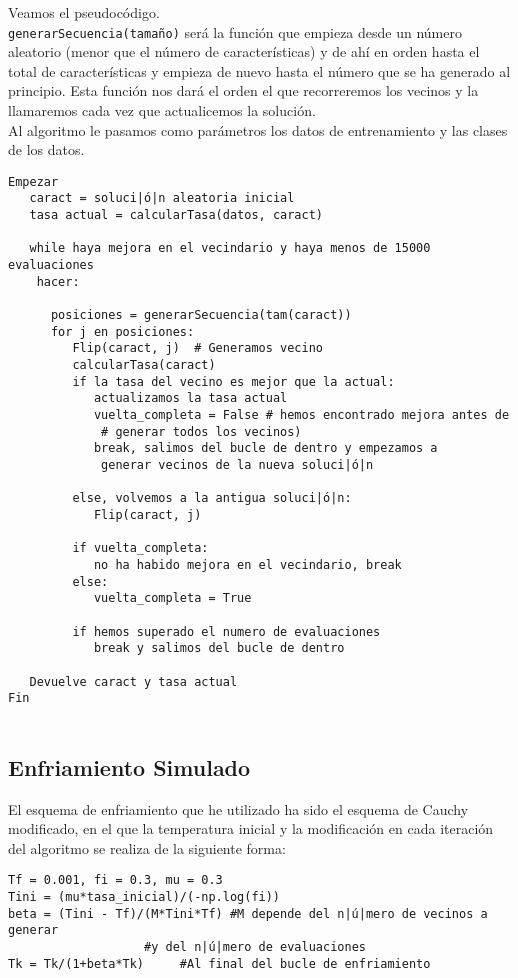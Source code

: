 \documentclass[12pt]{article}
\begin{document}
Veamos el pseudocódigo.\\
\texttt{generarSecuencia(tamaño)} será la función que empieza desde un número aleatorio (menor que el número de características) y de ahí en orden hasta el total de características y empieza de nuevo hasta el número que se ha generado al principio. Esta función nos dará el orden el que recorreremos los vecinos y la llamaremos cada vez que actualicemos la solución.\\
Al algoritmo le pasamos como parámetros los datos de entrenamiento y las clases de los datos.
\begin{lstlisting}
Empezar
   caract = soluci|ó|n aleatoria inicial
   tasa actual = calcularTasa(datos, caract)
   
   while haya mejora en el vecindario y haya menos de 15000 evaluaciones
    hacer:
      
      posiciones = generarSecuencia(tam(caract))
      for j en posiciones:
         Flip(caract, j)  # Generamos vecino
         calcularTasa(caract)
         if la tasa del vecino es mejor que la actual:
            actualizamos la tasa actual
            vuelta_completa = False # hemos encontrado mejora antes de
             # generar todos los vecinos)
            break, salimos del bucle de dentro y empezamos a 
             generar vecinos de la nueva soluci|ó|n
         
         else, volvemos a la antigua soluci|ó|n:
            Flip(caract, j)
            
         if vuelta_completa:
            no ha habido mejora en el vecindario, break
         else:
            vuelta_completa = True
         
         if hemos superado el numero de evaluaciones
            break y salimos del bucle de dentro
   
   Devuelve caract y tasa actual
Fin
   
\end{lstlisting}

\subsection{Enfriamiento Simulado}
El esquema de enfriamiento que he utilizado ha sido el esquema de Cauchy modificado, en el que la temperatura inicial y la modificación en cada iteración del algoritmo se realiza de la siguiente forma:
\begin{lstlisting}
Tf = 0.001, fi = 0.3, mu = 0.3
Tini = (mu*tasa_inicial)/(-np.log(fi))
beta = (Tini - Tf)/(M*Tini*Tf) #M depende del n|ú|mero de vecinos a generar 
   			       #y del n|ú|mero de evaluaciones
Tk = Tk/(1+beta*Tk) 	#Al final del bucle de enfriamiento
\end{lstlisting}
\end{document}
